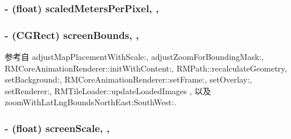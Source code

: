 \hypertarget{interface_r_m_map_contents_a1ad726ecd59ef33b559d35c8d1cef95e}{
\subsubsection[{scaled\-Meters\-Per\-Pixel}]{\setlength{\rightskip}{0pt plus 5cm}-\/ (float) scaled\-Meters\-Per\-Pixel\hspace{0.3cm}{\ttfamily [read]}, {\ttfamily [atomic]}, {\ttfamily [assign]}}}\label{interface_r_m_map_contents_a1ad726ecd59ef33b559d35c8d1cef95e}
\hypertarget{interface_r_m_map_contents_a658f2c0b02e7dded8f625329c658f925}{
\subsubsection[{screen\-Bounds}]{\setlength{\rightskip}{0pt plus 5cm}-\/ (C\-G\-Rect) screen\-Bounds\hspace{0.3cm}{\ttfamily [read]}, {\ttfamily [atomic]}, {\ttfamily [assign]}}}\label{interface_r_m_map_contents_a658f2c0b02e7dded8f625329c658f925}


参考自 adjust\-Map\-Placement\-With\-Scale\-:, adjust\-Zoom\-For\-Bounding\-Mask\-:, R\-M\-Core\-Animation\-Renderer\-::init\-With\-Content\-:, R\-M\-Path\-::recalculate\-Geometry, set\-Background\-:, R\-M\-Core\-Animation\-Renderer\-::set\-Frame\-:, set\-Overlay\-:, set\-Renderer\-:, R\-M\-Tile\-Loader\-::update\-Loaded\-Images , 以及 zoom\-With\-Lat\-Lng\-Bounds\-North\-East\-:\-South\-West\-:.

\hypertarget{interface_r_m_map_contents_aeae93353d6604c3304d945da9490d809}{
\subsubsection[{screen\-Scale}]{\setlength{\rightskip}{0pt plus 5cm}-\/ (float) screen\-Scale\hspace{0.3cm}{\ttfamily [read]}, {\ttfamily [nonatomic]}, {\ttfamily [assign]}}}\label{interface_r_m_map_contents_aeae93353d6604c3304d945da9490d809}



